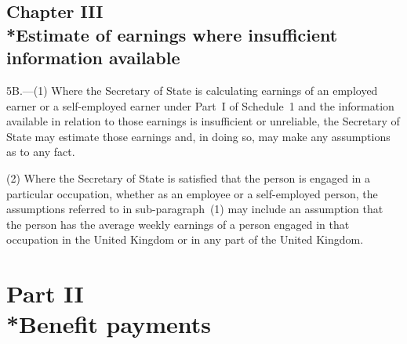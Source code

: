 \documentclass[12pt,a4paper]{article}
\begin{document}

\subsection[Chapter III --- Estimate of earnings where insufficient information available]{Chapter III\\*Estimate of earnings where insufficient information available}

\renewcommand\parthead{--- Schedule 1 Part I Chapter III}

5B.---(1)  Where the 
Secretary of State  %
is calculating earnings of an employed earner or a self-employed earner under Part~I of Schedule~1 and the information available in relation to those earnings is insufficient or unreliable, the 
Secretary of State  %
may estimate those earnings and, in doing so, may make any assumptions as to any fact.

(2) Where the 
Secretary of State  %
is satisfied that the person is engaged in a particular occupation, whether as an employee or a self-employed person, the assumptions referred to in sub-paragraph~(1) may include an assumption that the person has the average weekly earnings of a person engaged in that occupation in the United Kingdom or in any part of the United Kingdom.


\section[Part II --- Benefit payments]{Part II\\*Benefit payments}
\end{document}
